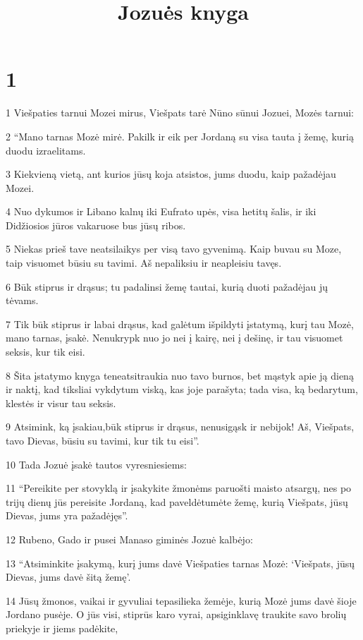 

\title{Jozuės knyga}

\chapter{1}

\par 1 Viešpaties tarnui Mozei mirus, Viešpats tarė Nūno sūnui Jozuei, Mozės tarnui: 
\par 2 “Mano tarnas Mozė mirė. Pakilk ir eik per Jordaną su visa tauta į žemę, kurią duodu izraelitams. 
\par 3 Kiekvieną vietą, ant kurios jūsų koja atsistos, jums duodu, kaip pažadėjau Mozei. 
\par 4 Nuo dykumos ir Libano kalnų iki Eufrato upės, visa hetitų šalis, ir iki Didžiosios jūros vakaruose bus jūsų ribos. 
\par 5 Niekas prieš tave neatsilaikys per visą tavo gyvenimą. Kaip buvau su Moze, taip visuomet būsiu su tavimi. Aš nepaliksiu ir neapleisiu tavęs. 
\par 6 Būk stiprus ir drąsus; tu padalinsi žemę tautai, kurią duoti pažadėjau jų tėvams. 
\par 7 Tik būk stiprus ir labai drąsus, kad galėtum išpildyti įstatymą, kurį tau Mozė, mano tarnas, įsakė. Nenukrypk nuo jo nei į kairę, nei į dešinę, ir tau visuomet seksis, kur tik eisi. 
\par 8 Šita įstatymo knyga teneatsitraukia nuo tavo burnos, bet mąstyk apie ją dieną ir naktį, kad tiksliai vykdytum viską, kas joje parašyta; tada visa, ką bedarytum, klestės ir visur tau seksis. 
\par 9 Atsimink, ką įsakiau,­būk stiprus ir drąsus, nenusigąsk ir nebijok! Aš, Viešpats, tavo Dievas, būsiu su tavimi, kur tik tu eisi”. 
\par 10 Tada Jozuė įsakė tautos vyresniesiems: 
\par 11 “Pereikite per stovyklą ir įsakykite žmonėms paruošti maisto atsargų, nes po trijų dienų jūs pereisite Jordaną, kad paveldėtumėte žemę, kurią Viešpats, jūsų Dievas, jums yra pažadėjęs”. 
\par 12 Rubeno, Gado ir pusei Manaso giminės Jozuė kalbėjo: 
\par 13 “Atsiminkite įsakymą, kurį jums davė Viešpaties tarnas Mozė: ‘Viešpats, jūsų Dievas, jums davė šitą žemę’. 
\par 14 Jūsų žmonos, vaikai ir gyvuliai tepasilieka žemėje, kurią Mozė jums davė šioje Jordano pusėje. O jūs visi, stiprūs karo vyrai, apsiginklavę traukite savo brolių priekyje ir jiems padėkite, 
